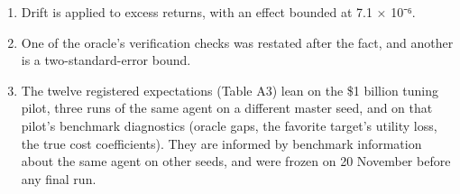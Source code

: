\documentclass[
  11pt]{article}
\begin{document}
\begin{enumerate}
  error of one seed's gap is 0.94 bps/yr against a target of 0.59.
\item
  Drift is applied to excess returns, with an effect bounded at 7.1 ×
  10⁻⁶.
\item
  One of the oracle's verification checks was restated after the fact,
  and another is a two-standard-error bound.
\item
  The twelve registered expectations (Table A3) lean on the \$1 billion
  tuning pilot, three runs of the same agent on a different master seed,
  and on that pilot's benchmark diagnostics (oracle gaps, the favorite
  target's utility loss, the true cost coefficients). They are informed
  by benchmark information about the same agent on other seeds, and were
  frozen on 20 November before any final run.
\end{enumerate}
\end{document}
